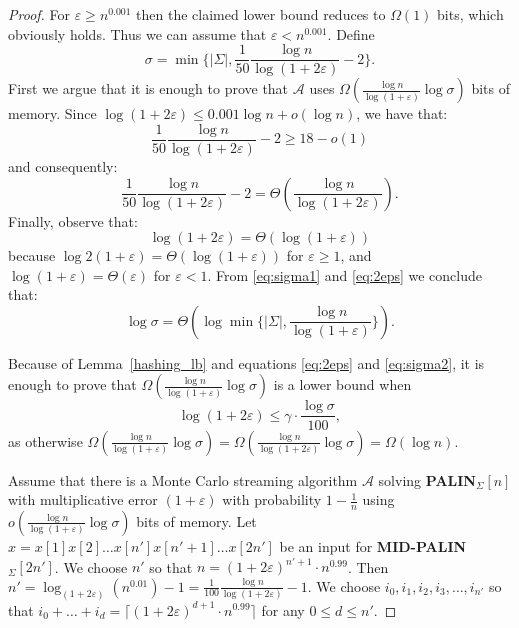 \documentclass{article}[11pt,letter]
\newcommand{\alg}{\mathcal{A}}
\newcommand{\midpalin}[1][n]{{\bf MID-PALIN}$_{\Sigma}[#1]$\xspace}
\newcommand{\palin}[1][n]{{\bf PALIN}$_{\Sigma}[#1]$\xspace}
\begin{document}
\begin{proof}
For $\varepsilon \ge n^{0.001}$ then the claimed lower bound reduces to $\Omega(1)$ bits,
which obviously holds. Thus we can assume that $\varepsilon < n^{0.001}$.
Define \[\sigma = \min \{|\Sigma|, \frac{1}{50} \frac{\log n}{\log(1+2\varepsilon)}-2\}.\]
First we argue that it is enough to prove that $\mathcal{A}$ uses
$\Omega(\frac{\log n}{\log(1+\varepsilon)}\log\sigma)$ bits of memory.
Since $\log (1+2\varepsilon) \le 0.001 \log n + o(\log n)$, we have that:
\begin{equation}
\label{eq_18}
\frac{1}{50}\frac{\log n}{\log(1+2\varepsilon)}-2  \ge 18 - o(1)
\end{equation}
and consequently:
\begin{equation}
\label{eq:sigma1}
\frac{1}{50}\frac{\log n}{\log(1+2\varepsilon)}-2 = \Theta(\frac{\log n}{\log(1+2\varepsilon)}).
\end{equation}
Finally, observe that:
 \begin{equation}
 \label{eq:2eps}
 \log(1+2\varepsilon) = \Theta(\log(1+\varepsilon))
 \end{equation}
because $\log 2(1+\varepsilon) = \Theta(\log(1+\varepsilon))$ for $\varepsilon \ge 1$,
and $\log(1+\varepsilon) = \Theta(\varepsilon)$ for $\varepsilon < 1$.
From \eqref{eq:sigma1} and \eqref{eq:2eps} we conclude that:
\begin{equation}
\label{eq:sigma2}
 \log\sigma = \Theta(\log \min\{|\Sigma|,  \frac{\log n}{\log(1+\varepsilon)} \}).
 \end{equation}

Because of Lemma~\ref{hashing_lb} and equations \eqref{eq:2eps} and \eqref{eq:sigma2},
it is enough to prove that $\Omega(\frac{\log n}{\log(1+\varepsilon)}\log\sigma)$ is a lower bound when
\begin{equation}
\label{foo2}
\log(1+2\varepsilon) \le \gamma \cdot \frac{\log\sigma}{100},
\end{equation} 
as otherwise $\Omega(\frac{\log n}{\log (1+\varepsilon)} \log \sigma ) = \Omega( \frac{\log n}{\log (1+2\varepsilon)} \log \sigma) = \Omega(\log n)$.

Assume that there is a Monte Carlo streaming algorithm $\alg$ solving \palin with multiplicative error $(1+\varepsilon)$
with probability $1-\frac{1}{n}$ using $o(\frac{\log n}{\log(1+\varepsilon)}\log \sigma )$ bits of memory.
Let $x = x[1] x[2] \ldots x[n'] x[n'+1] \ldots x[2n']$ be an input for \midpalin[2n']. We choose $n'$ so that $n=(1+2\varepsilon)^{n'+1} \cdot n^{0.99} $. Then $n'= \log_{(1+2\varepsilon)} (n^{0.01})-1 = \frac{1}{100} \frac{\log n}{\log(1+2\varepsilon)}-1$.
We choose $i_0,i_1, i_{2},i_{3},\ldots,i_{n'}$ so that  $i_0+\ldots+i_d = \lceil(1+2\varepsilon)^{d+1} \cdot n^{0.99}\rceil$ for any $0 \le d \le n'$.


\end{proof}
\end{document}

